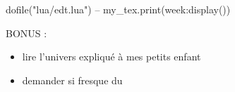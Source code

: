 \documentclass[10pt]{article}
\begin{document}
\thispagestyle{empty}

\setlength{\arrayrulewidth}{0.7mm}
\renewcommand{\arraystretch}{1.25}


\begin{luacode*}
    dofile("lua/edt.lua")
	-- my_tex.print(week:display())
\end{luacode*}

{\Large BONUS : \begin{itemize}
	\item lire l'univers expliqué à mes petits enfant
	\item demander si fresque du 
\end{itemize}}
\end{document}
